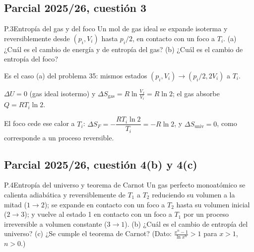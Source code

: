 \subsection{Parcial 2025/26, cuestión 3}
\begin{problema}{P.3}{Entropía del gas y del foco}
Un mol de gas ideal se expande isoterma y reversiblemente desde $(p_i,V_i)$ hasta $p_i/2$, en contacto con un foco a
$T_i$. (a) ¿Cuál es el cambio de energía y de entropía del gas? (b) ¿Cuál es el cambio de entropía del foco?
\end{problema}

\begin{resolucion}
\idea Es el caso (a) del problema 35: mismos estados $(p_i,V_i)\to(p_i/2,2V_i)$ a $T_i$.

 $\Delta U=0$ (gas ideal isotermo) y $\Delta S_{\mathrm{gas}}=R\ln\frac{V_f}{V_i}=\boxed{R\ln2}$; el gas absorbe
$Q=RT_i\ln2$.

 El foco cede ese calor a $T_i$: $\Delta S_F=-\dfrac{RT_i\ln2}{T_i}=\boxed{-R\ln2}$, y
$\Delta S_{\mathrm{univ}}=0$, como corresponde a un proceso reversible.
\end{resolucion}

\subsection{Parcial 2025/26, cuestión 4(b) y 4(c)}
\begin{problema}{P.4}{Entropía del universo y teorema de Carnot}
Un gas perfecto monoatómico se calienta adiabática y reversiblemente de $T_1$ a $T_2$ reduciendo su volumen a la
mitad ($1\to2$); se expande en contacto con un foco a $T_2$ hasta su volumen inicial ($2\to3$); y vuelve al estado 1 en
contacto con un foco a $T_1$ por un proceso irreversible a volumen constante ($3\to1$). (b) ¿Cuál es el cambio de
entropía del universo? (c) ¿Se cumple el teorema de Carnot? (Dato: $\frac{x^n-1}{\ln x^n}>1$ para $x>1$, $n>0$.)
\end{problema}

